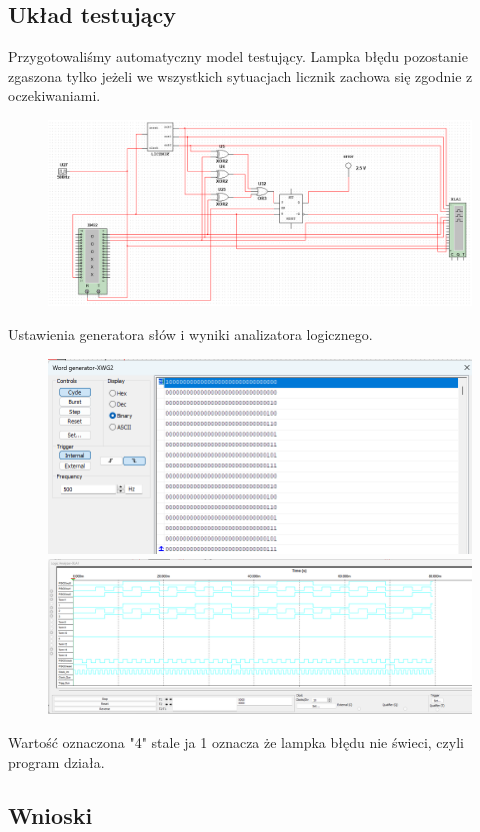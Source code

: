 \documentclass{article}
\begin{document}
\subsection{Układ testujący}
Przygotowaliśmy automatyczny model testujący. Lampka błędu pozostanie zgaszona tylko jeżeli we wszystkich sytuacjach licznik zachowa się zgodnie z oczekiwaniami.
\begin{figure}[H]
\includegraphics[width = \textwidth]{3a_tester}
\end{figure}
Ustawienia generatora słów i wyniki analizatora logicznego.
\begin{figure}[H]
\includegraphics[width = \textwidth]{3a_generator}
\includegraphics[width = \textwidth]{3a_analizer}
\end{figure}
Wartość oznaczona "4" stale ja 1 oznacza że lampka błędu nie świeci, czyli program działa.
\subsection{Wnioski}
\end{document}
